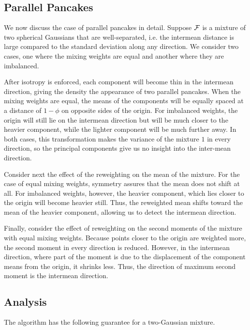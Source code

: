 \documentclass{book}
\numberwithin{exercise}{chapter}
\begin{document}
\subsection{Parallel Pancakes}\label{sec:pancakes}
We now discuss the case of parallel pancakes in detail.
Suppose ${\mathcal{F}}$ is a mixture of two spherical Gaussians that are
well-separated, i.e. the intermean distance is large compared to the
standard deviation along any direction.  We consider two cases, one
where the mixing weights are equal and another where they are
imbalanced.

After isotropy is enforced, each component will become thin in the
intermean direction, giving the density the appearance of two
parallel pancakes.  When the mixing weights are equal, the means of
the components will be equally spaced at a distance of $1 -
\phi$ on opposite sides of the origin.  For imbalanced weights, the
origin will still lie on the intermean direction but will be much
closer to the heavier component, while the lighter component will be
much further away.  In both cases, this transformation makes the
variance of the mixture $1$ in every direction, so the principal
components give us no insight into the inter-mean direction.

Consider next the effect of the reweighting on the mean of the
mixture.  For the case of equal mixing weights, symmetry assures that
the mean does not shift at all.  For imbalanced weights, however, the
heavier component, which lies closer to the origin will become heavier
still.  Thus, the reweighted mean shifts toward the mean of the
heavier component, allowing us to detect the intermean direction.

Finally, consider the effect of reweighting on the second moments of
the mixture with equal mixing weights.  Because points closer to the
origin are weighted more, the second moment in every direction is
reduced.  However, in the intermean direction, where part of the
moment is due to the displacement of the component means from the
origin, it shrinks less.  Thus, the direction of maximum second
moment is the intermean direction.

\subsection{Analysis}\label{sec:isopca-analysis}

The algorithm has the following guarantee for a two-Gaussian mixture.
\end{document}
